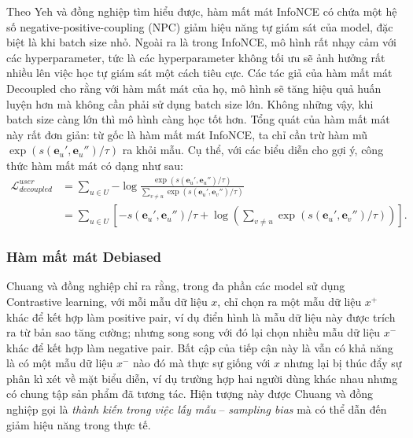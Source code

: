 \noindent Theo Yeh và đồng nghiệp \cite{decoupled-loss} tìm hiểu được, hàm mất mát InfoNCE có chứa một hệ số negative-positive-coupling (NPC) giảm hiệu năng tự giám sát của model, đặc biệt là khi batch size nhỏ. Ngoài ra là trong InfoNCE, mô hình rất nhạy cảm với các hyperparameter, tức là các hyperparameter không tối ưu sẽ ảnh hưởng rất nhiều lên việc học tự giám sát một cách tiêu cực. Các tác giả của hàm mất mát Decoupled cho rằng với hàm mất mát của họ, mô hình sẽ tăng hiệu quả huấn luyện hơn mà không cần phải sử dụng batch size lớn. Không những vậy, khi batch size càng lớn thì mô hình càng học tốt hơn. Tổng quát của hàm mất mát này rất đơn giản: từ gốc là hàm mất mát InfoNCE, ta chỉ cần trừ hàm mũ $\exp(s(\mathbf{e}_u', \mathbf{e}_u'') / \tau)$ ra khỏi mẫu. Cụ thể, với các biểu diễn cho gợi ý, công thức hàm mất mát có dạng như sau:
\begin{equation}
    \begin{aligned}
        \mathcal{L}_\textit{decoupled ssl}^\textit{user} & = \sum_{u \in U}{-\log{\frac{\exp(s(\mathbf{e}_u', \mathbf{e}_u'') / \tau)}{\sum_{v \neq u}{\exp(s(\mathbf{e}_u', \mathbf{e}_v'') / \tau)}}}} \\
        & = \sum_{u \in U}{\left[-s(\mathbf{e}_u', \mathbf{e}_u'') / \tau + \log{\left(\sum_{v \neq u}{\exp(s(\mathbf{e}_u', \mathbf{e}_v'') / \tau)}\right)}\right]}.
    \end{aligned}
\end{equation}

\subsubsection{Hàm mất mát Debiased}

\noindent Chuang và đồng nghiệp \cite{debiased-loss} chỉ ra rằng, trong đa phần các model sử dụng Contrastive learning, với mỗi mẫu dữ liệu $x$, chỉ chọn ra một mẫu dữ liệu $x^+$ khác để kết hợp làm positive pair, ví dụ điển hình là mẫu dữ liệu này được trích ra từ bản sao tăng cường; nhưng song song với đó lại chọn nhiều mẫu dữ liệu $x^-$ khác để kết hợp làm negative pair. Bất cập của tiếp cận này là vẫn có khả năng là có một mẫu dữ liệu $x^-$ nào đó mà thực sự giống với $x$ nhưng lại bị thúc đẩy sự phân kì xét về mặt biểu diễn, ví dụ trường hợp hai người dùng khác nhau nhưng có chung tập sản phẩm đã tương tác. Hiện tượng này được Chuang và đồng nghiệp gọi là \textit{thành kiến trong việc lấy mẫu} -- \textit{sampling bias} mà có thể dẫn đến giảm hiệu năng trong thực tế.

